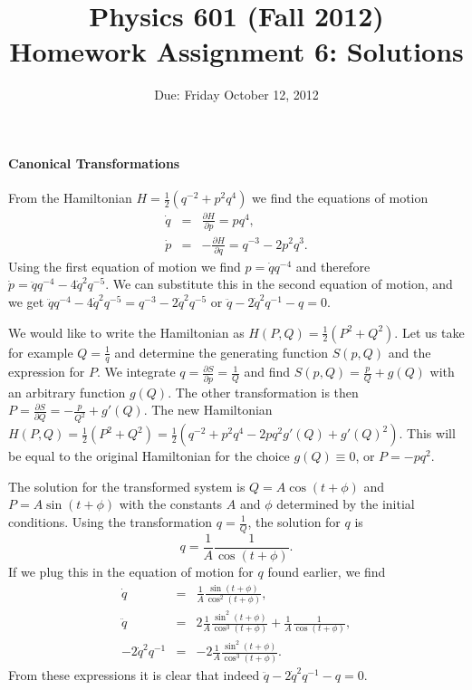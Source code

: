 \documentclass[letterpaper,11pt]{article}
\title{Physics 601 (Fall 2012) \\ Homework Assignment 6: Solutions}
\date{Due: Friday October 12, 2012}
\begin{document}
\maketitle

\paragraph*{Canonical Transformations}
From the Hamiltonian $H = \frac{1}{2} (q^{-2} + p^2 q^4)$ we find the equations of motion
\begin{eqnarray*}
 \dot{q} & = & \frac{\partial H}{\partial p} = p q^4, \\
 \dot{p} & = & - \frac{\partial H}{\partial q} = q^{-3} - 2 p^2 q^3.
\end{eqnarray*}
Using the first equation of motion we find $p = \dot{q} q^{-4}$ and therefore $\dot{p} = \ddot{q} q^{-4} - 4\dot{q}^2 q^{-5}$.  We can substitute this in the second equation of motion, and we get $\ddot{q} q^{-4} - 4\dot{q}^2 q^{-5} = q^{-3} - 2 \dot{q}^2 q^{-5}$ or $\ddot{q} - 2 \dot{q}^2 q^{-1} - q = 0$.

We would like to write the Hamiltonian as $H(P,Q) = \frac{1}{2}(P^2 + Q^2)$.  Let us take for example $Q = \frac{1}{q}$ and determine the generating function $S(p,Q)$ and the expression for $P$.  We integrate $q = \frac{\partial S}{\partial p} = \frac{1}{Q}$ and find $S(p,Q) = \frac{p}{Q} + g(Q)$ with an arbitrary function $g(Q)$.  The other transformation is then $P = \frac{\partial S}{\partial Q} = -\frac{p}{Q^2} + g'(Q)$.  The new Hamiltonian $H(P,Q) = \frac{1}{2}(P^2 + Q^2) = \frac{1}{2} (q^{-2} + p^2 q^4 - 2 p q^2 g'(Q) + g'(Q)^2)$.  This will be equal to the original Hamiltonian for the choice $g(Q) \equiv 0$, or $P = -p q^2$.

The solution for the transformed system is $Q = A \cos (t + \phi)$ and $P = A \sin (t + \phi)$ with the constants $A$ and $\phi$ determined by the initial conditions.  Using the transformation $q = \frac{1}{Q}$, the solution for $q$ is $$q = \frac{1}{A} \frac{1}{\cos (t + \phi)}.$$  If we plug this in the equation of motion for $q$ found earlier, we find
\begin{eqnarray*}
 \dot{q} & = & \frac{1}{A} \frac{\sin (t+\phi)}{\cos^2 (t+\phi)}, \\
 \ddot{q} & = & 2 \frac{1}{A} \frac{\sin^2 (t+\phi)}{\cos^3 (t+\phi)} + \frac{1}{A} \frac{1}{\cos (t+\phi)}, \\
 -2\dot{q}^2 q^{-1} & = & -2 \frac{1}{A} \frac{\sin^2 (t+\phi)}{\cos^3 (t+\phi)}.
\end{eqnarray*}
From these expressions it is clear that indeed $\ddot{q} - 2 \dot{q}^2 q^{-1} - q = 0$.
\end{document}
